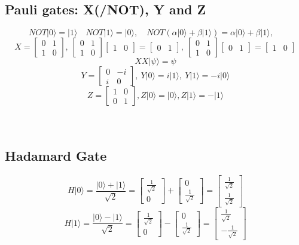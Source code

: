 \documentclass[11pt, fleqn]{article}
\begin{document}
\subsection{Pauli gates: X(/NOT), Y and Z}
\[ NOT|0\rangle = |1\rangle \quad NOT|1\rangle = |0\rangle,\quad NOT (\alpha|0\rangle+\beta|1\rangle)=\alpha|0\rangle+\beta|1\rangle,\quad\]
\[X =\begin{bmatrix}0 & 1\\1 & 0\end{bmatrix},\:
\begin{bmatrix}0 & 1\\1 & 0\end{bmatrix}\begin{bmatrix} 1&0\end{bmatrix}=\begin{bmatrix} 0&1\end{bmatrix},\:
\begin{bmatrix}0 & 1\\1 & 0\end{bmatrix}\begin{bmatrix} 0&1\end{bmatrix}=\begin{bmatrix} 1&0\end{bmatrix}\]
\[XX|\psi\rangle=\psi\]
\[Y=\begin{bmatrix}0&-i\\i&0\end{bmatrix},\:Y|0\rangle = i|1\rangle,\:Y|1\rangle =-i|0\rangle\]
\[Z=\begin{bmatrix}1&0\\0&1\end{bmatrix},Z|0\rangle = |0\rangle,Z|1\rangle =-|1\rangle\]
\\~\\
\subsection{Hadamard Gate}
\[H|0\rangle = \frac{|0\rangle +|1\rangle}{\sqrt 2}=\begin{bmatrix}\frac{1}{\sqrt 2}\\0\end{bmatrix}+
\begin{bmatrix}0\\\frac{1}{\sqrt 2}\end{bmatrix}=
\begin{bmatrix}\frac{1}{\sqrt 2}\\\frac{1}{\sqrt 2}\end{bmatrix}\]
\[H|1\rangle = \frac{|0\rangle -|1\rangle}{\sqrt 2}=
\begin{bmatrix}\frac{1}{\sqrt 2}\\0\end{bmatrix}-
\begin{bmatrix}0\\\frac{1}{\sqrt 2}\end{bmatrix}=
\begin{bmatrix}\frac{1}{\sqrt 2}\\-\frac{1}{\sqrt 2}\end{bmatrix}
\]
\end{document}
